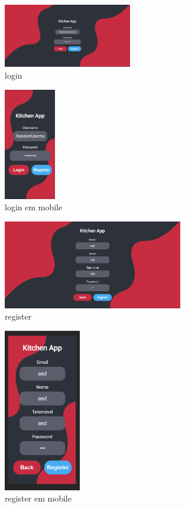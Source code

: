 \documentclass[a4paper]{report}
\begin{document}
\begin{figure}[H]
    \centering 
    \includegraphics[width=0.5\textwidth]{images/login.png}  
    \caption{login}
    \label{fig:login}
\end{figure}

\begin{figure}[H]
    \centering 
    \includegraphics[width=0.2\textwidth]{images/login_mobile.png}  
    \caption{login em mobile}
    \label{fig:login_mobile}
\end{figure}

\begin{figure}[H]
    \centering 
    \includegraphics[width=0.7\textwidth]{images/generate.png}  
    \caption{register}
    \label{fig:register}
\end{figure}

\begin{figure}[H]
    \centering 
    \includegraphics[width=0.3\textwidth]{images/generate_mobile.png}  
    \caption{register em mobile}
    \label{fig:register_mobile}
\end{figure}
\end{document}
